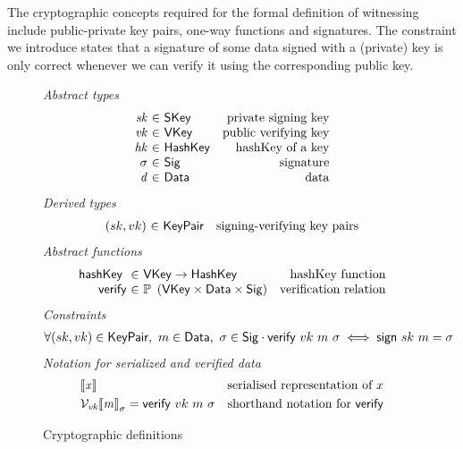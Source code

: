 \documentclass[11pt,a4paper,dvipsnames]{article}
\newcommand{\VKey}{\type{VKey}}
\newcommand{\SKey}{\type{SKey}}
\newcommand{\HashKey}{\type{HashKey}}
\newcommand{\KeyPair}{\type{KeyPair}}
\newcommand{\Sig}{\type{Sig}}
\newcommand{\Data}{\type{Data}}
\newcommand{\verify}[3]{\fun{verify} ~ #1 ~ #2 ~ #3}
\newcommand{\sign}[2]{\fun{sign} ~ #1 ~ #2}
\newcommand{\serialised}[1]{\llbracket \var{#1} \rrbracket}
\newcommand{\hashKey}[1]{\fun{hashKey}~ \var{#1}}
\theoremstyle{definition}
\theoremstyle{definition}
\begin{document}
The cryptographic concepts required for the formal definition
of witnessing include public-private key pairs, one-way functions
and signatures. The constraint we introduce states that a signature of
some data signed with a (private) key is only correct whenever we can verify
it using the corresponding public key.

\begin{figure}
  \emph{Abstract types}
  \begin{equation*}
    \begin{array}{r@{~\in~}lr}
      \var{sk} & \SKey & \text{private signing key}\\
      \var{vk} & \VKey & \text{public verifying key}\\
      \var{hk} & \HashKey & \text{hashKey of a key}\\
      \sigma & \Sig  & \text{signature}\\
      \var{d} & \Data  & \text{data}\\
    \end{array}
  \end{equation*}
  \emph{Derived types}
  \begin{equation*}
    \begin{array}{r@{~\in~}lr}
      (sk, vk) & \KeyPair & \text{signing-verifying key pairs}
    \end{array}
  \end{equation*}
  \emph{Abstract functions}
  \begin{equation*}
    \begin{array}{r@{~\in~}lr}
      \hashKey{} & \VKey \to \HashKey
      & \text{hashKey function} \\
      \fun{verify} & \powerset{\left(\VKey \times \Data \times \Sig\right)}
      & \text{verification relation}\\
    \end{array}
  \end{equation*}
  \emph{Constraints}
  \begin{align*}
    & \forall (sk, vk) \in \KeyPair,~ m \in \Data,~ \sigma \in \Sig \cdot
      \verify{vk}{m}{\sigma} \iff \sign{sk}{m} = \sigma
  \end{align*}
  \emph{Notation for serialized and verified data}
  \begin{align*}
    & \serialised{x} & \text{serialised representation of } x\\
    & \mathcal{V}_{\var{vk}}{\serialised{m}}_{\sigma} = \verify{vk}{m}{\sigma}
      & \text{shorthand notation for } \fun{verify}
  \end{align*}
  \caption{Cryptographic definitions}
  \label{fig:crypto-defs}
\end{figure}
\end{document}
